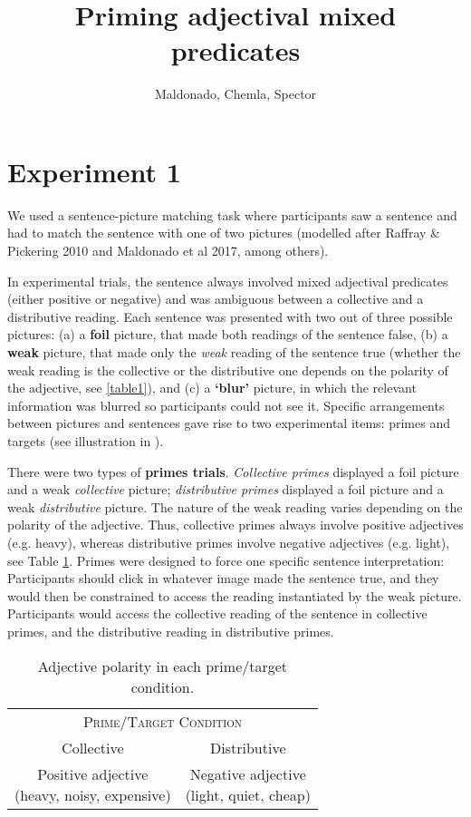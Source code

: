 \documentclass[a4paper, 11pt]{article}
\title{Priming adjectival mixed predicates}
\author{Maldonado, Chemla, Spector}
\begin{document}
\section{Experiment 1}
We used a sentence-picture matching task where participants saw a sentence and had to match the sentence with one of two pictures (modelled after Raffray \& Pickering 2010 and Maldonado et al 2017, among others). 

In experimental trials, the sentence always involved mixed adjectival predicates (either positive or negative) and was ambiguous between a collective and a distributive reading. 
Each sentence was presented with two out of three possible pictures: (a) a \textbf{foil} picture, that made both readings of the sentence false, (b) a \textbf{weak} picture, that made only the \emph{weak} reading of the sentence true (whether the weak reading is the collective or the distributive one depends on the polarity of the adjective, see \ref{table1}), and (c) a \textbf{`blur'} picture, in which the relevant information was blurred so participants could not see it. 
Specific arrangements between pictures and sentences gave rise to two experimental items: primes and targets (see illustration in ). 

There were two types of \textbf{primes trials}. \textit{Collective primes} displayed a foil picture and a weak \emph{collective} picture; \textit{distributive primes} displayed a foil picture and a weak \emph{distributive} picture. The nature of the weak reading varies depending on the polarity of the adjective. Thus, collective primes always involve positive adjectives (e.g. heavy), whereas distributive primes involve negative adjectives (e.g. light), see Table \ref{table:adjtype}. 
Primes were designed to force one specific sentence interpretation: Participants should click in whatever image made the sentence true, and they would then be constrained to access the reading instantiated by the weak picture. Participants would access the collective reading of the sentence in collective primes, and the distributive reading in distributive primes. 

\begin{table}[h]
\centering
\begin{tabular}{cc}
\toprule
\multicolumn{2}{c}{\textsc{Prime/Target Condition}}\\[0.1cm]
Collective & Distributive \\
\midrule
\parbox[c]{4.5cm}{Positive adjective \\ (heavy, noisy, expensive)} & \parbox[c]{3.5cm}{Negative adjective \\ (light, quiet, cheap)}  \\
\bottomrule  
\end{tabular}
\caption{Adjective polarity in each prime/target condition.}\label{table:adjtype}
\end{table}
\end{document}
